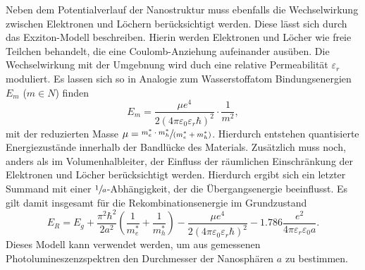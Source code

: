 Neben dem Potentialverlauf der Nanostruktur muss ebenfalls die Wechselwirkung zwischen Elektronen und Löchern berücksichtigt werden.
Diese lässt sich durch das Exziton-Modell beschreiben. Hierin werden Elektronen und Löcher wie freie Teilchen behandelt, die eine
Coulomb-Anziehung aufeinander ausüben. Die Wechselwirkung mit der Umgebnung wird duch eine relative Permeabilität
$\varepsilon_r$ moduliert. Es lassen sich so in Analogie zum Wasserstoffatom Bindungsenergien $E_m$ ($m \in N$) finden
\begin{equation}
  E_m = \frac{\mu e^4}{2 (4\pi\varepsilon_0 \varepsilon_r \hbar)^2} \cdot \frac{1}{m^2},
\end{equation}
mit der reduzierten Masse $\mu = \sfrac{m_e^* \cdot m_h^*}{(m_e^* + m_h^*)}$.
Hierdurch entstehen quantisierte Energiezustände innerhalb der
Bandlücke des Materials. Zusätzlich muss noch, anders als im Volumenhalbleiter, der Einfluss der räumlichen
Einschränkung der Elektronen und Löcher berücksichtigt werden. Hierdurch ergibt sich ein letzter Summand mit einer
$\sfrac{1}{a}$-Abhängigkeit, der die Übergangsenergie beeinflusst. Es gilt damit insgesamt für die
Rekombinationsenergie im Grundzustand
\begin{equation}
  E_R = E_g + \frac{\pi^2\hbar^2}{ 2  a^2} \left(\frac{1}{m_e^*} + \frac{1}{m_h^*}\right) -\frac{\mu e^4}{2 (4\pi\varepsilon_0 \varepsilon_r \hbar)^2}
  - \num{1.786} \frac{e^2}{4\pi\varepsilon_r\varepsilon_0 a}.
  \label{eq: E_R}
\end{equation}
Dieses Modell kann verwendet werden, um aus gemessenen Photolumineszenzspektren den Durchmesser der Nanosphären $a$ zu bestimmen.